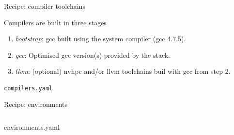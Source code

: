 \documentclass[aspectratio=43]{beamer}
\begin{document}
\begin{frame}[fragile]{Recipe: compiler toolchains}

Compilers are built in three stages
\begin{enumerate}
\item \emph{bootstrap}: gcc built using the system compiler (gcc 4.7.5).
\item \emph{gcc}: Optimised gcc version(s) provided by the stack.
\item \emph{llvm}: (optional) nvhpc and/or llvm toolchains buil with gcc from step 2.
\end{enumerate}


\begin{code}{\lstinline{compilers.yaml}}

\end{code}

\end{frame}

\begin{frame}[fragile]{Recipe: environments}

    \begin{columns}[T]
        \begin{column}{0.5\textwidth}
        \begin{codecolumn}{environments.yaml}

        \end{codecolumn}
        \end{column}
        \begin{column}{0.5\textwidth}
        \begin{codecolumnnotitle}{}

        \end{codecolumnnotitle}
        \end{column}
    \end{columns}

\end{frame}
\end{document}
